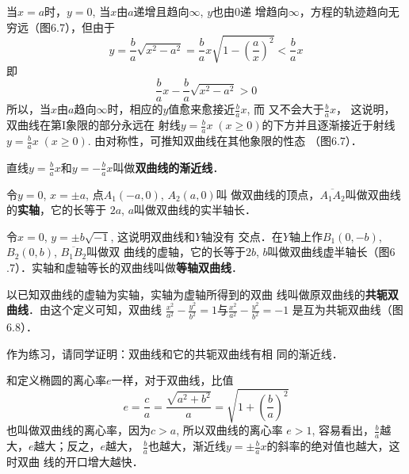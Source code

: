 当$x=a$时，$y=0$, 当$x$由$a$递增且趋向$\infty$, $y$也由0递
增趋向$\infty$，方程的轨迹趋向无穷远（图6.7），但由于
\[y=\frac{b}{a}\sqrt{x^2-a^2}=\frac{b}{a}x\sqrt{1-\left(\frac{a}{x}\right)^2}<\frac{b}{a}x\]
即
\[\frac{b}{a}x-\frac{b}{a}\sqrt{x^2-a^2}>0\]
所以，当$x$由$a$趋向$\infty$时，相应的$y$值愈来愈接近$\frac{b}{a}x$, 而
又不会大于$\frac{b}{a}x$，
这说明，双曲线在第I象限的部分永远在
射线$y=\frac{b}{a}x\; (x\ge 0)$的下方并且逐渐接近于射线$y=\frac{b}{a}x\; (x\ge 0)$. 由对称性，可推知双曲线在其他象限的性态
（图6.7）．

直线$y=\frac{b}{a}x$和$y=-\frac{b}{a}x$叫做\textbf{双曲线的渐近线}．

令$y=0$, $x=\pm a$, 点$A_1(-a,0)$, $A_2(a,0)$叫
做双曲线的顶点，$\overline{A_1A_2}$叫做双曲线的\textbf{实轴}，它的长等于
$2a$, $a$叫做双曲线的实半轴长．

令$x=0$, $y=\pm b\sqrt{-1}$, 这说明双曲线和$Y$轴没有
交点．在$Y$轴上作$B_1(0,-b)$, $B_2(0,b)$, $\overline{B_1B_2}$叫做双
曲线的虚轴，它的长等于$2b$, $b$叫做双曲线虚半轴长（图6
.7）．实轴和虚轴等长的双曲线叫做\textbf{等轴双曲线}．

以已知双曲线的虚轴为实轴，实轴为虚轴所得到的双曲
线叫做原双曲线的\textbf{共轭双曲线}．由这个定义可知，双曲线
$\frac{x^2}{a^2}-\frac{y^2}{b^2}=1$与$\frac{x^2}{a^2}-\frac{y^2}{b^2}=-1$
是互为共轭双曲线（图6.8）．

作为练习，请同学证明：双曲线和它的共轭双曲线有相
同的渐近线．

\begin{figure}[htp]
    \centering
{}
    \caption{}
\end{figure}

和定义椭圆的离心率$e$一样，对于双曲线，比值
\[e=\frac{c}{a}=\frac{\sqrt{a^2+b^2}}{a}=\sqrt{1+\left(\frac{b}{a}\right)^2}\]
也叫做双曲线的离心率，因为$c>a$, 所以双曲线的离心率
$e>1$, 容易看出，$\frac{b}{a}$越大，$e$越大；反之，$e$越大，
$\frac{b}{a}$也越大，渐近线$y=\pm \frac{b}{a}x$的斜率的绝对值也越大，这时双曲
线的开口增大越快．


